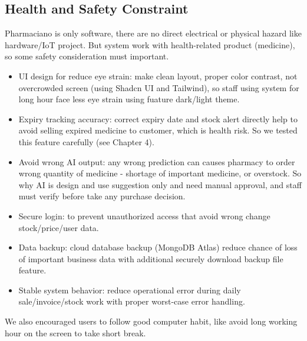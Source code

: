 \subsection{Health and Safety Constraint}
Pharmaciano is only software, there are no direct electrical or physical hazard like hardware/IoT project. But system work with health-related product (medicine), so some safety consideration must important.
\begin{itemize}
\item UI design for reduce eye strain: make clean layout, proper color contrast, not overcrowded screen (using Shadcn UI and Tailwind), so staff using system for long hour face less eye strain using fuature dark/light theme.

\item Expiry tracking accuracy: correct expiry date and stock alert directly help to avoid selling expired medicine to customer, which is health risk. So we tested this feature carefully (see Chapter 4).

\item Avoid wrong AI output: any wrong prediction can causes pharmacy to order wrong quantity of medicine - shortage of important medicine, or overstock. So why AI is design and use suggestion only and need manual approval, and staff must verify before take any purchase decision.

\item Secure login: to prevent unauthorized access that avoid wrong change stock/price/user data.

\item Data backup: cloud database backup (MongoDB Atlas) reduce chance of loss of important business data with additional securely download backup file feature.

\item Stable system behavior: reduce operational error during daily sale/invoice/stock work with proper worst-case error handling.
\end{itemize}
We also encouraged users to follow good computer habit, like avoid long working hour on the screen to take short break.

